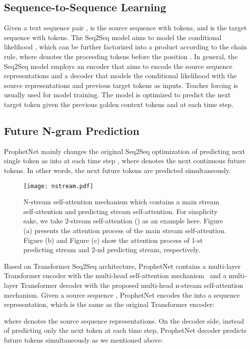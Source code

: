 \documentclass[11pt,a4paper]{article}
\begin{document}
\subsection{Sequence-to-Sequence Learning}
Given a text sequence pair ,  is the source sequence with  tokens, and  is the target sequence with  tokens.
The Seq2Seq model aims to model the conditional likelihood , which can be further factorized into a product  according to the chain rule, where  denotes the proceeding tokens before the position .
In general, the Seq2Seq model employs an encoder that aims to encode the source sequence representations and a decoder that models the conditional likelihood with the source representations and previous target tokens as inputs.
Teacher forcing is usually used for model training. The model is optimized to predict the next target token  given the previous golden context tokens  and  at each time step.

\subsection{Future N-gram Prediction} \label{sec:m1}
ProphetNet mainly changes the original Seq2Seq optimization of predicting next single token as  into  at each time step , where  denotes the next continuous  future tokens.
In other words, the next  future tokens are predicted simultaneously. 


\begin{figure*}[h]
    \centering
	\texttt{[image: nstream.pdf]}
	\caption{N-stream self-attention mechanism which contains a main stream self-attention and  predicting stream self-attention. For simplicity sake, we take 2-stream self-attention () as an example here. Figure (a) presents the attention process of the main stream self-attention. Figure (b) and Figure (c) show the attention process of 1-st predicting stream and 2-nd predicting stream, respectively. }\label {fig:nstream}
\end{figure*}

Based on Transformer Seq2Seq architecture, ProphetNet contains a multi-layer Transformer encoder with the multi-head self-attention mechanism~\cite{vaswani2017attention} and a multi-layer Transformer decoder with the proposed multi-head n-stream self-attention mechanism.
Given a source sequence , ProphetNet encodes the  into a sequence representation, which is the same as the original Transformer encoder:

where  denotes the source sequence representations.
On the decoder side, instead of predicting only the next token at each time step, ProphetNet decoder predicts  future tokens simultaneously as we mentioned above:
\end{document}
